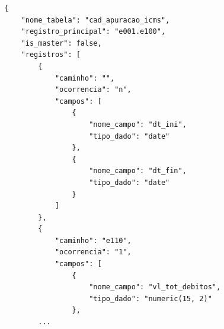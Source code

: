 \begin{quadro}[H]
    \centering
    \caption{Exemplo de modelo JSON de regras de metadados para a EFD ICMS IPI}
    \label{qua:json_metadados}
\begin{lstlisting}[basicstyle=\ttfamily\footnotesize, frame=single]
{
    "nome_tabela": "cad_apuracao_icms",
    "registro_principal": "e001.e100",
    "is_master": false,
    "registros": [
        {
            "caminho": "",
            "ocorrencia": "n",
            "campos": [
                {
                    "nome_campo": "dt_ini",
                    "tipo_dado": "date"
                },
                {
                    "nome_campo": "dt_fin",
                    "tipo_dado": "date"
                }
            ]
        },
        {
            "caminho": "e110",
            "ocorrencia": "1",
            "campos": [
                {
                    "nome_campo": "vl_tot_debitos",
                    "tipo_dado": "numeric(15, 2)"
                },
        ...
\end{lstlisting}
\end{quadro}
